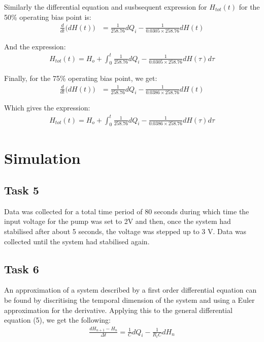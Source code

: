 \documentclass{article}
\begin{document}
Similarly the differential equation and susbsequent expression for $H_{tot}(t)$ for the 50\% operating bias point is:
\begin{align}
\frac{d}{dt}\big(dH(t)\big) &= \frac{1}{258.76}dQ_i - \frac{1}{0.0305 \times 258.76}dH(t) \nonumber
\end{align}

And the expression:
\begin{align}
H_{tot}(t) = H_o + \int_{0}^{t}\frac{1}{258.76}dQ_i - \frac{1}{0.0305\times 258.76}dH(\tau) d\tau \nonumber
\end{align}

\newpage

Finally, for the 75\% operating bias point, we get:
\begin{align}
\frac{d}{dt}\big(dH(t)\big) &= \frac{1}{258.76}dQ_i - \frac{1}{0.0386 \times 258.76}dH(t) \nonumber
\end{align}

Which gives the expression:
\begin{align}
H_{tot}(t) = H_o + \int_{0}^{t}\frac{1}{258.76}dQ_i - \frac{1}{0.0386 \times 258.76}dH(\tau) d\tau \nonumber
\end{align}



\section{Simulation}

\subsection{Task 5}
Data was collected for a total time period of 80 seconds during which time the input voltage for the pump was set to 2$\si{\volt}$ and then, once the system had stabilised after about 5 seconds, the voltage was stepped up to 3 $\si{\volt}$. Data was collected until the system had stabilised again.

\subsection{Task 6}
An approximation of a system described by a first order differential equation can be found by discritising the temporal dimension of the system and using a Euler approximation for the derivative. Applying this to the general differential equation (5), we get the following:
\begin{align}
	\frac{dH_{n+1} - H_n}{\Delta t} = \frac{1}{C}dQ_i - \frac{1}{R_{t}C}dH_n \nonumber
\end{align}
\end{document}
